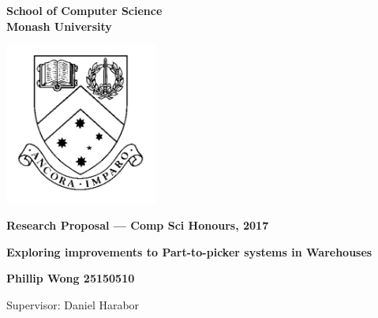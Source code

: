 \documentclass[a4paper,11pt]{article}
\begin{document}
\thispagestyle{empty} %
\renewcommand{\thepage}{\roman{page}}

\begin{spacing}{1.5}
\begin{center}
{\Large \bfseries
School of Computer Science \\
Monash University}

\vspace*{30mm}

\includegraphics[width=5cm]{graphics/MonashCrest.pdf}

\vspace*{15mm}

{\large \bfseries
Research Proposal --- Comp Sci Honours, 2017
}

\vspace*{10mm}

{\LARGE \bfseries
Exploring improvements to Part-to-picker systems in Warehouses 
}

\vspace*{20mm}

{\large \bfseries
Phillip Wong 25150510

\vspace*{20mm}


Supervisor: Daniel Harabor
}

\end{center}
\end{spacing}

\newpage

\tableofcontents

\newpage
\setcounter{page}{1}
\renewcommand{\thepage}{\arabic{page}}

	\begin{abstract} %
	\noindent \textbf The order picking process is the number one expense in warehouse systems. Here we look at part-to-picker a type of order picking where the products are autonomously retrieved and given to the pickers. Previous research have focused on improvements in the multi-agent path finding but they often overlook simple adjustments or additions which may reduce complexity of the problem.  This project will test the effect that these aspects have on improving order-picking. We will create a simulation and focus on the warehouse layout first. The results of this project will help identify how small adjustments may increase the efficiency of the order picking process.
	
\end{abstract}
\end{document}
